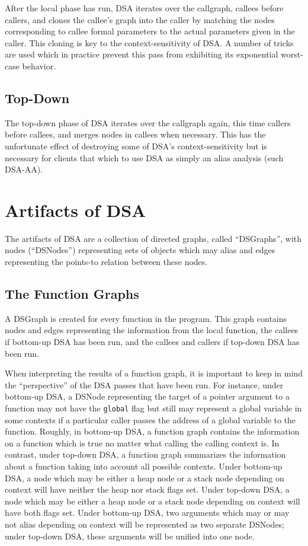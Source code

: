 \documentclass{article}
\begin{document}
After the local phase has run, DSA iterates over the callgraph,
callees before callers, and clones the callee's graph into the caller
by matching the nodes corresponding to callee formal parameters to the
actual parameters given in the caller.  This cloning is key to the
context-sensitivity of DSA.  A number of tricks are used which in
practice prevent this pass from exhibiting its exponential worst-case
behavior.

\subsection{Top-Down}

The top-down phase of DSA iterates over the callgraph again, this time
callers before callees, and merges nodes in callees when necessary.
This has the unfortunate effect of destroying some of DSA's
context-sensitivity but is necessary for clients that which to use DSA
as simply an alias analysis (such DSA-AA).

\section{Artifacts of DSA}

The artifacts of DSA are a collection of directed graphs, called
``DSGraphs'', with nodes (``DSNodes'') representing sets of objects
which may alias and edges representing the points-to relation between
these nodes.

\subsection{The Function Graphs}

A DSGraph is created for every function in the program.  This graph
contains nodes and edges representing the information from the local
function, the callees if bottom-up DSA has been run, and the callees
and callers if top-down DSA has been run.

When interpreting the results of a function graph, it is important to
keep in mind the ``perspective'' of the DSA passes that have been run.
For instance, under bottom-up DSA, a DSNode representing the target of
a pointer argument to a function may not have the \texttt{global} flag
but still may represent a global variable in some contexts if a
particular caller passes the address of a global variable to the
function.  Roughly, in bottom-up DSA, a function graph contains the
information on a function which is true no matter what calling the
calling context is.  In contrast, under top-down DSA, a function graph
summarizes the information about a function taking into account all
possible contexts.  Under bottom-up DSA, a node which may be either a
heap node or a stack node depending on context will have neither the
heap nor stack flags set.  Under top-down DSA, a node which may be
either a heap node or a stack node depending on context will have both
flags set.  Under bottom-up DSA, two arguments which may or may not
alias depending on context will be represented as two separate
DSNodes; under top-down DSA, these arguments will be unified into one
node.
\end{document}
